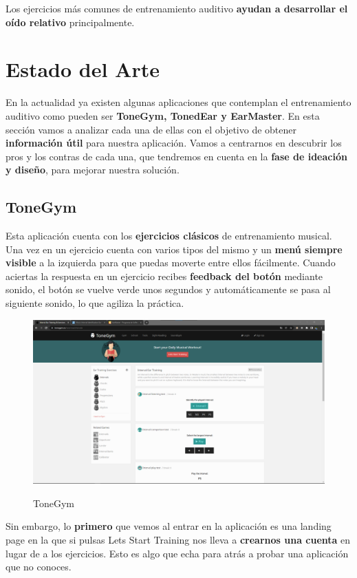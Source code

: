 \documentclass[12pt,twoside,titlepage]{report}
\begin{document}
Los ejercicios más comunes de entrenamiento auditivo \textbf{ayudan a desarrollar el oído relativo} principalmente.

\section{Estado del Arte}

En la actualidad ya existen algunas aplicaciones que contemplan el entrenamiento auditivo como pueden ser \textbf{ToneGym, TonedEar y EarMaster}. En esta sección vamos a analizar cada una de ellas con el objetivo de obtener \textbf{información útil} para nuestra aplicación. Vamos a centrarnos en descubrir los pros y los contras de cada una, que tendremos en cuenta en la \textbf{fase de ideación y diseño}, para mejorar nuestra solución.

\subsection{ToneGym}

Esta aplicación cuenta con los \textbf{ejercicios clásicos} de entrenamiento musical. Una vez en un ejercicio cuenta con varios tipos del mismo y un \textbf{menú siempre visible} a la izquierda para que puedas moverte entre ellos fácilmente. Cuando aciertas la respuesta en un ejercicio recibes \textbf{feedback del botón} mediante sonido, el botón se vuelve verde unos segundos y automáticamente se pasa al siguiente sonido, lo que agiliza la práctica.

\begin{figure}[H] 
    \includegraphics[scale=0.25]{Estado del Arte/tonegym}
    \centering
    \label{fig:tonegym}
    \caption{ToneGym}
\end{figure}

Sin embargo, lo \textbf{primero} que vemos al entrar en la aplicación es una landing page en la que si pulsas Lets Start Training nos lleva a \textbf{crearnos una cuenta} en lugar de a los ejercicios. Esto es algo que echa para atrás a probar una aplicación que no conoces. 
\end{document}
